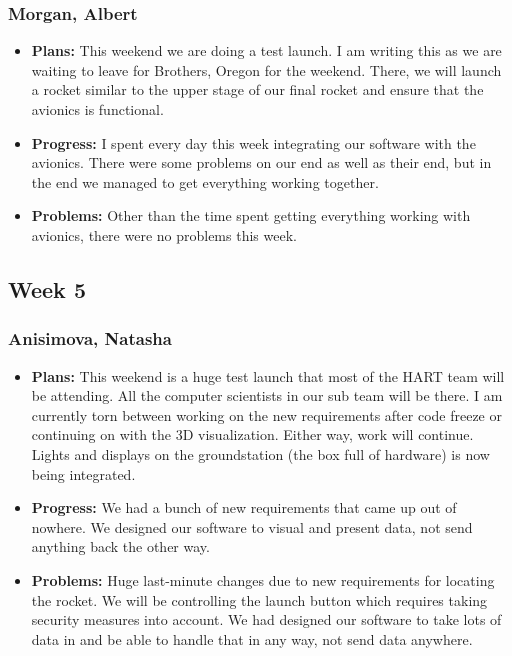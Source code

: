 \documentclass[10pt,draftclsnofoot,onecolumn]{IEEEtran}
\begin{document}
\subsubsection{Morgan, Albert}
\begin{itemize}
	\item \textbf{Plans: }
	This weekend we are doing a test launch. I am writing this as we are waiting to leave for Brothers, Oregon for the weekend. There, we will launch a rocket similar to the upper stage of our final rocket and ensure that the avionics is functional.
	\item \textbf{Progress: }
	I spent every day this week integrating our software with the avionics. There were some problems on our end as well as their end, but in the end we managed to get everything working together.
	\item \textbf{Problems: }
	Other than the time spent getting everything working with avionics, there were no problems this week.
\end{itemize}

\subsection{Week 5}
\subsubsection{Anisimova, Natasha}
\begin{itemize}
	\item \textbf{Plans: }This weekend is a huge test launch that most of the HART team will be attending. All the computer scientists in our sub team will be there. I am currently torn between working on the new requirements after code freeze or continuing on with the 3D visualization. Either way, work will continue. Lights and displays on the groundstation (the box full of hardware) is now being integrated.
	\item \textbf{Progress:  }
	We had a bunch of new requirements that came up out of nowhere. We designed our software to visual and present data, not send anything back the other way.
	\item \textbf{Problems: }
	Huge last-minute changes due to new requirements for locating the rocket. We will be controlling the launch button which requires taking security measures into account. We had designed our software to take lots of data in and be able to handle that in any way, not send data anywhere.
\end{itemize}
\end{document}
